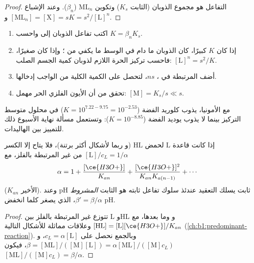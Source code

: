\begin{proof}
التفاعل هو مجموع الذوبان (الثابت $K_s$)
وتكوين $\mathrm{ML}_n$ ($\beta_n$). وعند الإشباع $[\mathrm{ML}_n]
= [\mathrm{X}] = s$ و$K = s^2/[\mathrm{L}]^n$.
\end{proof}

\begin{method}\label{met:b1:complexation:dissolve-precipitate}
\begin{enumerate}
  \item اكتب تفاعل الذوبان إلى  واحسب
        $K = \beta_n K_s$.
  \item إذا كان $K$ كبيرًا، كان الذوبان  ما دام
        في الوسط ما يكفي من ؛ وإذا كان صغيرًا، فاحسب تركيز  الحرة
        اللازم لذوبان كمية الجسم الصلب:
        $[\mathrm{L}]^n = s^2/K$.
  \item أضف  المرتبطة في ، $n s$، لتحصل على
        الكمية الكلية من  الواجب إدخالها.
  \item تحقق من أن الأيون الفلزي الحر مهمل: $[\mathrm{M}] = K_s/s
        \ll s$.
\end{enumerate}
\end{method}

مع الأمونيا، يذوب كلوريد الفضة ($K = 10^{7.22 - 9.75} = 10^{-2.53}$)
في محلول متوسط التركيز بينما لا يذوب يوديد الفضة
($K = 10^{-8.85}$): وتستعمل مسألة نهاية الأسبوع ذلك للتمييز بين
الهاليدات.

\begin{proposition}\label{prop:b1:complexation:ligand-acidity}
إذا كانت  قاعدة $\mathrm{L}$ لحمض $\mathrm{HL}$ (و
ربما لأشكال أكثر برتنة)، فلا يتاح إلا الكسر $[\mathrm{L}]/c_L =
1/\alpha$ من  غير المرتبطة بالفلز، مع
\[
  \alpha = 1 + \frac{[\ce{H3O+}]}{K_{an}} + \frac{[\ce{H3O+}]^2}{K_{an}K_{a(n-1)}}
  + \cdots
\]
($K_{an}$  الأخير). وعند pH ثابت يسلك التعقيد عندئذ
سلوك تفاعل ثابته هو الثابت \emph{المشروط}
$\beta' = \beta/\alpha$، الذي يصغر كلما انخفض pH.
\end{proposition}

\begin{proof}
تتوزع  غير المرتبطة بالفلز بين L وHL و
وما بعدها، مع $[\mathrm{HL}] = [\mathrm{L}][\ce{H3O+}]/K_{an}$ وعلاقات
مماثلة للأشكال التالية (\cref{ch:b1:predominant-reaction}). وبالجمع نحصل على $c_L = \alpha[\mathrm{L}]$،
و$\beta = [\mathrm{ML}]/([\mathrm{M}][\mathrm{L}]) =
\alpha[\mathrm{ML}]/([\mathrm{M}]c_L)$، فيكون $[\mathrm{ML}]/([\mathrm{M}]c_L)
= \beta/\alpha$.
\end{proof}

